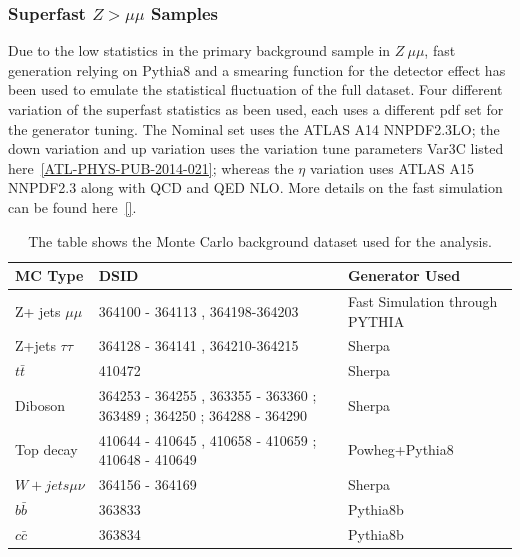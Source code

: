 \subsubsection{Superfast $Z > \mu\mu$  Samples}
\label{section:superfast}
Due to the low statistics in the primary background sample in  $Z \> \mu \mu$, fast generation relying on Pythia8 and a smearing function for the detector effect has been used to emulate the statistical fluctuation of the full dataset. Four different variation of the superfast statistics as been used, each uses a different pdf set for the generator tuning. The Nominal set uses the ATLAS A14 NNPDF2.3LO; the down variation and up variation uses the variation tune parameters Var3C listed here~\ref{ATL-PHYS-PUB-2014-021}; whereas the $\eta$ variation uses ATLAS A15 NNPDF2.3 along with QCD and QED NLO. More details on the fast simulation can be found here~\ref{}.

\begin{table}[!htb]
    \begin{center}
    \caption{
        The table shows the Monte Carlo background dataset used for the analysis. 
    \label{table:MC}
    }
\label{tab:MC samples}
\begin{tabular}{|l|l|l|}
\hline
\textbf{MC Type}   & \textbf{DSID}                                                         &\textbf{Generator Used}\\ \hline
Z+ jets $\mu\mu$   & 364100 - 364113 , 364198-364203                                       &Fast Simulation through PYTHIA\\ \hline
Z+jets $\tau \tau$ & 364128 - 364141 , 364210-364215                                       &Sherpa\\ \hline
$t\bar{t}$         & 410472                                                                &Sherpa\\ \hline
Diboson            & 364253 - 364255 , 363355 - 363360 ; 363489 ; 364250 ; 364288 - 364290 &Sherpa\\ \hline
Top decay          & 410644 - 410645 , 410658 - 410659 ; 410648 - 410649                   &Powheg+Pythia8\\ \hline
$W + jets \mu\nu$  & 364156 - 364169                                                       &Sherpa\\ \hline
$b\bar{b}$         & 363833                                                                &Pythia8b\\ \hline
$c\bar{c}$         & 363834                                                                &Pythia8b\\ \hline

\end{tabular}
\end{center}
\end{table}

